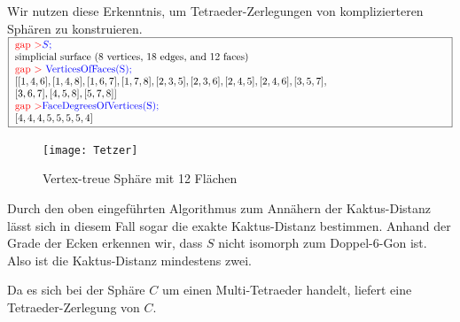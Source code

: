 \documentclass[12pt,titlepage,twoside,cleardoublepage]{article}
\theoremstyle{nummermitklammern}
\newtheorem{bsp}[temp]{Beispiel}
\newtheorem{bsp}[zahl]{Beispiel}
\numberwithin{equation}{section}
\begin{document}
Wir nutzen diese Erkenntnis, um Tetraeder-Zerlegungen von komplizierteren Sphären zu konstruieren.\newline
$\fbox{
\parbox{15cm}{
\textcolor{red}{gap $>$}\textcolor{blue}{$S;$}\\
simplicial surface (8 vertices, 18 edges, and 12 faces)\\
\textcolor{red}{gap $>$} \textcolor{blue}{VerticesOfFaces(S);}\\
$[ [ 1, 4, 6 ], [ 1, 4, 8 ], [ 1, 6, 7 ], [ 1, 7, 8 ], [ 2, 3, 5 ],
[ 2, 3, 6 ], [ 2, 4, 5 ], [ 2, 4, 6 ], [ 3, 5, 7 ],$\newline
$ [ 3, 6, 7 ],
[ 4, 5, 8 ], [ 5, 7, 8 ] ]$\newline
\textcolor{red}{gap $>$}\textcolor{blue}{ FaceDegreesOfVertices(S);}\\
$[ 4, 4, 4, 5, 5, 5, 5, 4 ]$
 }}$\\
 \begin{figure}[H]
\begin{center}
\texttt{[image: Tetzer]}
\end{center}
\caption{Vertex-treue Sphäre mit 12 Flächen}
\end{figure}
Durch den oben eingeführten Algorithmus zum Annähern der Kaktus-Distanz lässt sich in diesem Fall sogar die exakte Kaktus-Distanz bestimmen. Anhand der Grade der Ecken erkennen wir, dass $S$ nicht isomorph zum Doppel-6-Gon ist. Also ist die Kaktus-Distanz mindestens zwei.
\begin{center}
 \end{center}
Da es sich bei der Sphäre $C$ um einen Multi-Tetraeder handelt, liefert  eine Tetraeder-Zerlegung von $C.$
\end{document}
